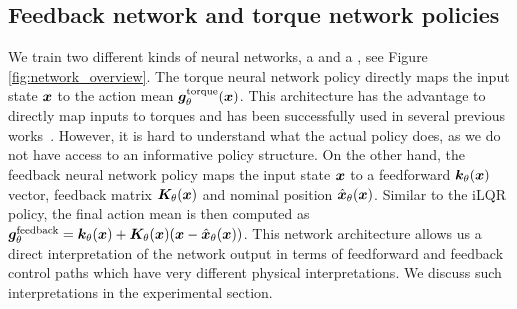 \subsection{Feedback network and torque network policies}
We train two different kinds of neural networks, a  and a , see Figure \ref{fig:network_overview}.
%
The torque neural network policy directly maps the input state $\bm{x}$ to the action mean $\bm{g}^\text{torque}_\theta(\bm{x})$. This architecture has the advantage to directly map inputs to torques and has been successfully used in several previous works~\cite{levine2015learning, levine2016end, schulman2015trust}. However, it is hard to understand what the actual policy does, as we do not have access to an informative policy structure.
On the other hand, the feedback neural network policy maps the input state $\bm{x}$ to a feedforward $\bm{k}_\theta(\bm{x})$ vector, feedback matrix $\bm{K}_\theta(\bm{x})$ and nominal position $\hat{\bm{x}}_\theta(\bm{x})$. Similar to the iLQR policy, the final action mean is then computed as $\bm{g}^\text{feedback}_\theta = \bm{k}_\theta(\bm{x}) + \bm{K}_\theta(\bm{x}) (\bm{x} - \hat{\bm{x}}_\theta(\bm{x}))$. This network architecture allows us a direct interpretation of the network output in terms of feedforward and feedback control paths which have very different physical interpretations. We discuss such interpretations in the experimental section.

